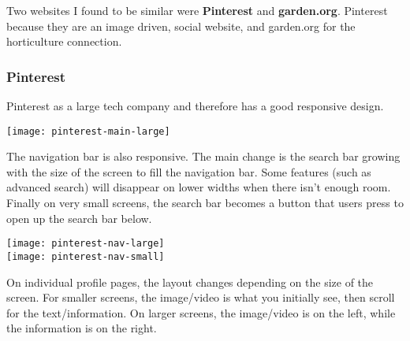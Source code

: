 \documentclass[portfolio.tex.tex]{subfiles}
\begin{document}
					Two websites I found to be similar were \textbf{Pinterest} and \textbf{garden.org}. Pinterest because they are an image driven, social website, and garden.org for the horticulture connection.

				\subsubsection{Pinterest}
					Pinterest as a large tech company and therefore has a good responsive design. \\

					\hspace{-0.8cm}

					\begin{center}
						\texttt{[image: pinterest-main-large]}\\

					\end{center}


					The navigation bar is also responsive. The main change is the search bar growing with the size of the screen to fill the navigation bar. Some features (such as advanced search) will disappear on lower widths when there isn't enough room. Finally on very small screens, the search bar becomes a button that users press to open up the search bar below.\\

					\begin{center}
						\texttt{[image: pinterest-nav-large]}\\
						\texttt{[image: pinterest-nav-small]}
					\end{center}

					On individual profile pages, the layout changes depending on the size of the screen. For smaller screens, the image/video is what you initially see, then scroll for the text/information. On larger screens, the image/video is on the left, while the information is on the right.
\end{document}
